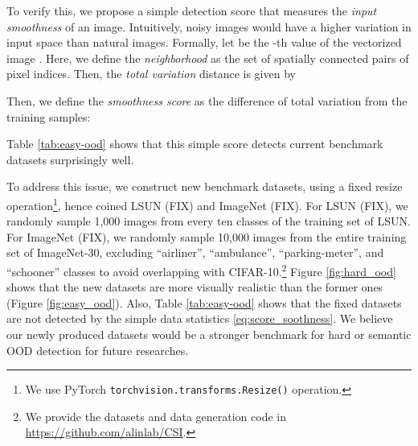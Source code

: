 \documentclass{article}
\newcommand{\code}[1]{\texttt{#1}}
\begin{document}
To verify this, we propose a simple detection score that measures the \textit{input smoothness} of an image. Intuitively, noisy images would have a higher variation in input space than natural images. Formally, let  be the -th value of the vectorized image . Here, we define the \textit{neighborhood}  as the set of spatially connected pairs of pixel indices. Then, the \textit{total variation} distance is given by

Then, we define the \textit{smoothness score} as the difference of total variation from the training samples:

Table \ref{tab:easy-ood} shows that this simple score detects current benchmark datasets surprisingly well.

To address this issue, we construct new benchmark datasets, using a fixed resize operation\footnote{We use PyTorch \code{torchvision.transforms.Resize()} operation.}, hence coined LSUN (FIX) and ImageNet (FIX). For LSUN (FIX), we randomly sample 1,000 images from every ten classes of the training set of LSUN. For ImageNet (FIX), we randomly sample 10,000 images from the entire training set of ImageNet-30, excluding ``airliner'', ``ambulance'', ``parking-meter'', and ``schooner'' classes to avoid overlapping with CIFAR-10.\footnote{We provide the datasets and data generation code in \url{https://github.com/alinlab/CSI}.} Figure \ref{fig:hard_ood} shows that the new datasets are more visually realistic than the former ones (Figure \ref{fig:easy_ood}). Also, Table \ref{tab:easy-ood} shows that the fixed datasets are not detected by the simple data statistics \eqref{eq:score_soothness}. We believe our newly produced datasets would be a stronger benchmark for hard or semantic OOD detection for future researches.
\end{document}
